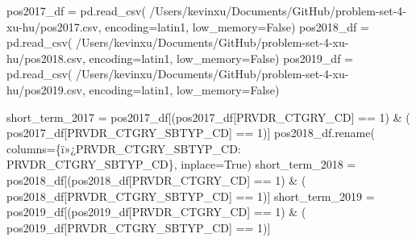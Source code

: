 \documentclass[
  letterpaper,
  DIV=11,
  numbers=noendperiod]{scrartcl}
\newenvironment{Shaded}{\begin{snugshade}}{\end{snugshade}}
\newcommand{\DecValTok}[1]{\textcolor[rgb]{0.68,0.00,0.00}{#1}}
\newcommand{\NormalTok}[1]{\textcolor[rgb]{0.00,0.23,0.31}{#1}}
\newcommand{\OperatorTok}[1]{\textcolor[rgb]{0.37,0.37,0.37}{#1}}
\newcommand{\StringTok}[1]{\textcolor[rgb]{0.13,0.47,0.30}{#1}}
\newcommand{\VariableTok}[1]{\textcolor[rgb]{0.07,0.07,0.07}{#1}}
\begin{document}
\begin{Shaded}
\begin{Highlighting}[]
\NormalTok{pos2017\_df }\OperatorTok{=}\NormalTok{ pd.read\_csv(}
    \StringTok{\textquotesingle{}/Users/kevinxu/Documents/GitHub/problem{-}set{-}4{-}xu{-}hu/pos2017.csv\textquotesingle{}}\NormalTok{, encoding}\OperatorTok{=}\StringTok{\textquotesingle{}latin1\textquotesingle{}}\NormalTok{, low\_memory}\OperatorTok{=}\VariableTok{False}\NormalTok{)}
\NormalTok{pos2018\_df }\OperatorTok{=}\NormalTok{ pd.read\_csv(}
    \StringTok{\textquotesingle{}/Users/kevinxu/Documents/GitHub/problem{-}set{-}4{-}xu{-}hu/pos2018.csv\textquotesingle{}}\NormalTok{, encoding}\OperatorTok{=}\StringTok{\textquotesingle{}latin1\textquotesingle{}}\NormalTok{, low\_memory}\OperatorTok{=}\VariableTok{False}\NormalTok{)}
\NormalTok{pos2019\_df }\OperatorTok{=}\NormalTok{ pd.read\_csv(}
    \StringTok{\textquotesingle{}/Users/kevinxu/Documents/GitHub/problem{-}set{-}4{-}xu{-}hu/pos2019.csv\textquotesingle{}}\NormalTok{, encoding}\OperatorTok{=}\StringTok{\textquotesingle{}latin1\textquotesingle{}}\NormalTok{, low\_memory}\OperatorTok{=}\VariableTok{False}\NormalTok{)}

\NormalTok{short\_term\_2017 }\OperatorTok{=}\NormalTok{ pos2017\_df[(pos2017\_df[}\StringTok{\textquotesingle{}PRVDR\_CTGRY\_CD\textquotesingle{}}\NormalTok{] }\OperatorTok{==} \DecValTok{1}\NormalTok{) }\OperatorTok{\&}\NormalTok{ (}
\NormalTok{    pos2017\_df[}\StringTok{\textquotesingle{}PRVDR\_CTGRY\_SBTYP\_CD\textquotesingle{}}\NormalTok{] }\OperatorTok{==} \DecValTok{1}\NormalTok{)]}
\NormalTok{pos2018\_df.rename(}
\NormalTok{    columns}\OperatorTok{=}\NormalTok{\{}\StringTok{\textquotesingle{}ï»¿PRVDR\_CTGRY\_SBTYP\_CD\textquotesingle{}}\NormalTok{: }\StringTok{\textquotesingle{}PRVDR\_CTGRY\_SBTYP\_CD\textquotesingle{}}\NormalTok{\}, inplace}\OperatorTok{=}\VariableTok{True}\NormalTok{)}
\NormalTok{short\_term\_2018 }\OperatorTok{=}\NormalTok{ pos2018\_df[(pos2018\_df[}\StringTok{\textquotesingle{}PRVDR\_CTGRY\_CD\textquotesingle{}}\NormalTok{] }\OperatorTok{==} \DecValTok{1}\NormalTok{) }\OperatorTok{\&}\NormalTok{ (}
\NormalTok{    pos2018\_df[}\StringTok{\textquotesingle{}PRVDR\_CTGRY\_SBTYP\_CD\textquotesingle{}}\NormalTok{] }\OperatorTok{==} \DecValTok{1}\NormalTok{)]}
\NormalTok{short\_term\_2019 }\OperatorTok{=}\NormalTok{ pos2019\_df[(pos2019\_df[}\StringTok{\textquotesingle{}PRVDR\_CTGRY\_CD\textquotesingle{}}\NormalTok{] }\OperatorTok{==} \DecValTok{1}\NormalTok{) }\OperatorTok{\&}\NormalTok{ (}
\NormalTok{    pos2019\_df[}\StringTok{\textquotesingle{}PRVDR\_CTGRY\_SBTYP\_CD\textquotesingle{}}\NormalTok{] }\OperatorTok{==} \DecValTok{1}\NormalTok{)]}


\end{Highlighting}
\end{Shaded}
\end{document}
